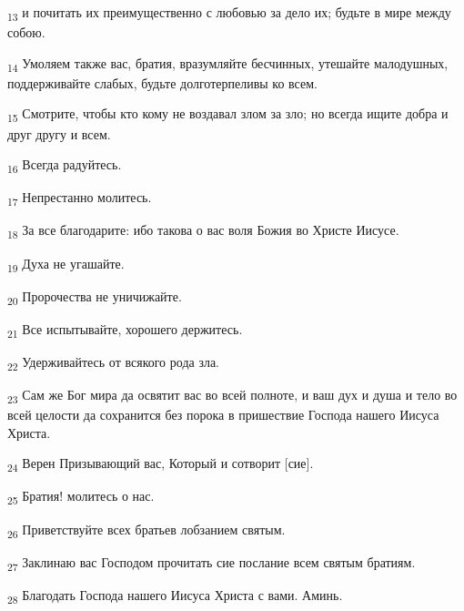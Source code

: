 \begin{tcolorbox}
\textsubscript{13} и почитать их преимущественно с любовью за дело их; будьте в мире между собою.
\end{tcolorbox}
\begin{tcolorbox}
\textsubscript{14} Умоляем также вас, братия, вразумляйте бесчинных, утешайте малодушных, поддерживайте слабых, будьте долготерпеливы ко всем.
\end{tcolorbox}
\begin{tcolorbox}
\textsubscript{15} Смотрите, чтобы кто кому не воздавал злом за зло; но всегда ищите добра и друг другу и всем.
\end{tcolorbox}
\begin{tcolorbox}
\textsubscript{16} Всегда радуйтесь.
\end{tcolorbox}
\begin{tcolorbox}
\textsubscript{17} Непрестанно молитесь.
\end{tcolorbox}
\begin{tcolorbox}
\textsubscript{18} За все благодарите: ибо такова о вас воля Божия во Христе Иисусе.
\end{tcolorbox}
\begin{tcolorbox}
\textsubscript{19} Духа не угашайте.
\end{tcolorbox}
\begin{tcolorbox}
\textsubscript{20} Пророчества не уничижайте.
\end{tcolorbox}
\begin{tcolorbox}
\textsubscript{21} Все испытывайте, хорошего держитесь.
\end{tcolorbox}
\begin{tcolorbox}
\textsubscript{22} Удерживайтесь от всякого рода зла.
\end{tcolorbox}
\begin{tcolorbox}
\textsubscript{23} Сам же Бог мира да освятит вас во всей полноте, и ваш дух и душа и тело во всей целости да сохранится без порока в пришествие Господа нашего Иисуса Христа.
\end{tcolorbox}
\begin{tcolorbox}
\textsubscript{24} Верен Призывающий вас, Который и сотворит [сие].
\end{tcolorbox}
\begin{tcolorbox}
\textsubscript{25} Братия! молитесь о нас.
\end{tcolorbox}
\begin{tcolorbox}
\textsubscript{26} Приветствуйте всех братьев лобзанием святым.
\end{tcolorbox}
\begin{tcolorbox}
\textsubscript{27} Заклинаю вас Господом прочитать сие послание всем святым братиям.
\end{tcolorbox}
\begin{tcolorbox}
\textsubscript{28} Благодать Господа нашего Иисуса Христа с вами. Аминь.
\end{tcolorbox}
